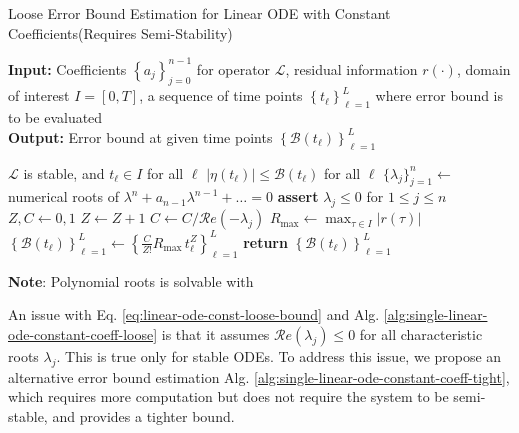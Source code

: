 \documentclass[accepted]{uai2023}
\newcommand{\Err}{\eta}
\newcommand{\Bound}{\mathcal{B}}
\renewcommand{\L}{\mathcal{L}}
\renewcommand{\Re}[1]{\mathcal{R}e\left(#1\right)}
\begin{document}
    \begin{algorithm}
        \small
        \caption{Loose Error Bound Estimation for Linear ODE with Constant Coefficients\quad (Requires Semi-Stability)}\label{alg:single-linear-ode-constant-coeff-loose}
        \textbf{Input:} Coefficients $\left\{a_j\right\}_{j=0}^{n-1}$ for operator $\L$, residual information $r(\cdot)$, domain of interest $I = [0, T]$, a sequence of time points $\left\{t_\ell\right\}_{\ell=1}^{L}$ where error bound is to be evaluated\\
        \textbf{Output:} Error bound at given time points $\left\{\Bound(t_\ell)\right\}_{\ell=1}^{L}$
        \begin{algorithmic}
            \Require $\L$ is stable, and $t_\ell \in I$ for all $\ell$
            \Ensure $\left|\Err(t_\ell)\right| \leq \Bound(t_\ell)$ for all $\ell$
            \State $\{\lambda_j\}_{j=1}^{n} \gets$ numerical roots of $\lambda^n+a_{n-1}\lambda^{n-1}+\dots=0$ 
            \State \textbf{assert} $\lambda_j \leq 0$ for $1 \leq j \leq n$ 
            \State $Z, C \gets 0, 1$
                \If{$\Re{\lambda_j} = 0$}
                    \State $Z \gets Z + 1$
                \Else
                    \State $C \gets C / \Re{-\lambda_j}$
                \EndIf
            \EndFor
            \State $R_{\max} \gets \max_{\tau \in I} |r(\tau)|$ 
            \State $\left\{\Bound(t_\ell)\right\}_{\ell=1}^{L} \gets \left\{\frac{C}{Z!}R_{\max}\, t_\ell^{Z}\right\}_{\ell=1}^{L}$
            \State \textbf{return} $\left\{\Bound(t_\ell)\right\}_{\ell=1}^{L}$
        \end{algorithmic}
        \vspace{0.5em} 
        \textbf{Note}: Polynomial roots is solvable with \cite{jenkins1970three}
    \end{algorithm}

    An issue with Eq. \ref{eq:linear-ode-const-loose-bound} and Alg. \ref{alg:single-linear-ode-constant-coeff-loose} is that it assumes $\Re{\lambda_j} \leq 0$ for all characteristic roots $\lambda_j$. 
    This is true only for stable ODEs. 
    To address this issue, we propose an alternative error bound estimation Alg. \ref{alg:single-linear-ode-constant-coeff-tight}, which requires more computation but does not require the system to be semi-stable, and provides a tighter bound.
\end{document}
